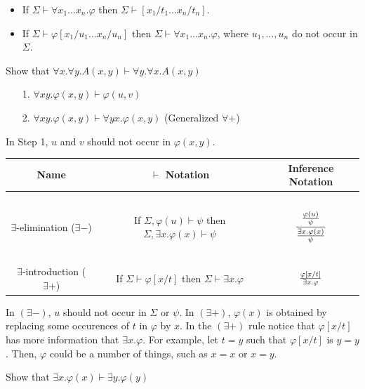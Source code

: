 \documentclass[english, 11pt]{article}
\begin{document}
    \begin{itemize}
      \item If $\Sigma \vdash \forall x_1 \ldots x_n. \varphi$ then $\Sigma \vdash [x_1/t_1\ldots x_n/t_n]$.
      \item If $\Sigma \vdash \varphi[x_1/u_1\ldots x_n/u_n]$ then $\Sigma \vdash \forall x_1\ldots x_n.\varphi$, where $u_1,\ldots,u_n$ do not occur in $\Sigma$.
    \end{itemize}
    \begin{exmp}
      Show that $\forall x. \forall y. A(x,y) \vdash \forall y. \forall x. A(x,y)$
      \begin{itemize}
        \item[1.] $\forall xy.\varphi(x,y) \vdash \varphi(u,v)$
        \item[2.] $\forall xy.\varphi(x,y) \vdash \forall yx.\varphi(x,y)$ (Generalized $\forall +$)
      \end{itemize}
      In Step 1, $u$ and $v$ should not occur in $\varphi(x,y)$.
    \end{exmp}

     \begin{center}
    \begin{tabular}{c | c | c }
      Name & $\vdash$ Notation & Inference Notation \\
      \hline
      \hline
      \ &&\\
      $\exists$-elimination ($\exists -$) & If $\Sigma ,\varphi(u) \vdash \psi$ then $\Sigma, \exists x.\varphi(x) \vdash \psi $ & $\displaystyle\frac{\frac{\varphi(u)}{\psi}}{\frac{\exists x.\varphi(x)}{\psi}}$ \\[3ex]
      \hline
      \hline
      \ &&\\
      $\exists$-introduction ($\exists +$) & If $\Sigma \vdash \varphi[x/t]$ then $\displaystyle \Sigma \vdash \exists x . \varphi$ & $\frac{\varphi[x/t]}{\exists x. \varphi}$ \\[3ex]
      \hline
      \hline
    \end{tabular}
    \end{center}
    In $(\exists -)$, $u$ should not occur in $\Sigma$ or $\psi$. In $(\exists +)$, $\varphi(x)$ is obtained by replacing some occurences of $t$ in $\varphi$ by $x$. In the $(\exists +)$ rule notice that $\varphi[x/t]$ has more information that $\exists x.  \varphi$. For example, let $t = y$ such that $\varphi[x/t]$ is $y = y$. Then, $\varphi$ could be a number of things, such as $x = x$ or $x = y$.

    \begin{exmp}
      Show that $\exists x. \varphi(x) \vdash \exists y. \varphi(y)$
      \begin{flagderiv}
      \end{flagderiv}
    \end{exmp}
\end{document}
